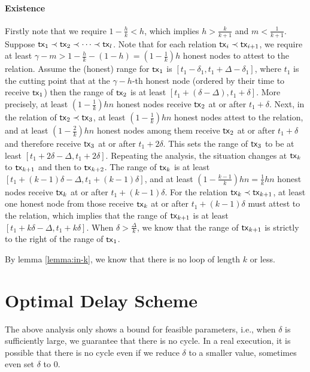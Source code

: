 \documentclass[runningheads]{llncs}
\begin{document}
\paragraph{Existence} Firstly note that we require $1-\frac{h}{k}<h$, which implies $h>\frac{k}{k+1}$ and $m<\frac{1}{k+1}$. Suppose $\mathsf{tx}_1\prec \mathsf{tx}_2\prec \cdots \prec \mathsf{tx}_l$. Note that for each relation $\mathsf{tx}_i\prec \mathsf{tx}_{i+1}$, we require at least $\gamma-m > 1-\frac{h}{k} - (1-h) = (1-\frac{1}{k})h$ honest nodes to attest to the relation. Assume the (honest) range for $\mathsf{tx}_1$ is $[t_1-\delta_1, t_1+\Delta-\delta_1]$, where $t_1$ is the cutting point that at the $\gamma-h$-th honest node (ordered by their time to receive $\mathsf{tx}_1$) then the range of $\mathsf{tx}_2$ is at least $[t_1+(\delta-\Delta), t_1+\delta]$. More precisely, at least $(1-\frac{1}{k})hn$ honest nodes receive $\mathsf{tx}_2$ at or after $t_1+\delta$. Next, in the relation of $\mathsf{tx}_2\prec \mathsf{tx}_3$, at least $(1-\frac{1}{k})hn$ honest nodes attest to the relation, and at least $(1-\frac{2}{k})hn$ honest nodes among them receive $\mathsf{tx}_2$ at or after $t_1+\delta$ and therefore receive $\mathsf{tx}_3$ at or after $t_1+2\delta$. This sets the range of $\mathsf{tx}_3$ to be at least $[t_1+2\delta-\Delta, t_1+2\delta]$. Repeating the analysis, the situation changes at $\mathsf{tx}_k$ to $\mathsf{tx}_{k+1}$ and then to $\mathsf{tx}_{k+2}$. The range of $\mathsf{tx}_{k}$ is at least $[t_1+(k-1)\delta - \Delta, t_1 + (k-1)\delta]$, and at least $(1-\frac{k-1}{k})hn = \frac{1}{k}hn$ honest nodes receive $\mathsf{tx}_k$ at or after $t_1+(k-1)\delta$. For the relation $\mathsf{tx}_{k}\prec \mathsf{tx}_{k+1}$, at least one honest node from those receive $\mathsf{tx}_k$ at or after $t_1+(k-1)\delta$ must attest to the relation, which implies that the range of $\mathsf{tx}_{k+1}$ is at least $[t_1+k\delta - \Delta, t_1+k\delta]$. When $\delta>\frac{\Delta}{k}$, we know that the range of $\mathsf{tx}_{k+1}$ is strictly to the right of the range of $\mathsf{tx}_1$. 

By lemma \ref{lemma:in-k}, we know that there is no loop of length $k$ or less. 

\section{Optimal Delay Scheme}
The above analysis only shows a bound for feasible parameters, i.e., when $\delta$ is sufficiently large, we guarantee that there is no cycle. In a real execution, it is possible that there is no cycle even if we reduce $\delta$ to a smaller value, sometimes even set $\delta$ to $0$. 
\end{document}
